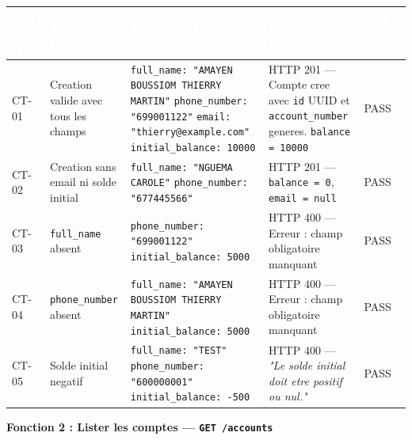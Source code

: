 \documentclass[12pt,a4paper]{article}
\begin{document}
\begin{longtable}{|L{1.6cm}|L{3.8cm}|L{5.2cm}|L{4.2cm}|L{1.8cm}|}
\hline
{}
\textbf{\textcolor{white}{Test Case ID}} & \textbf{\textcolor{white}{Test Case Description}} & \textbf{\textcolor{white}{Test Input (Test Case Value)}} & \textbf{\textcolor{white}{Expected Results}} & \textbf{\textcolor{white}{Test Case Status}} \\
\hline
CT-01 & Creation valide avec tous les champs &
\texttt{full\_name: "AMAYEN BOUSSIOM THIERRY MARTIN"} \newline \texttt{phone\_number: "699001122"} \newline \texttt{email: "thierry@example.com"} \newline \texttt{initial\_balance: 10000} &
HTTP 201 --- Compte cree avec \texttt{id} UUID et \texttt{account\_number} generes. \texttt{balance = 10000} & PASS \\
\hline
{}
CT-02 & Creation sans email ni solde initial &
\texttt{full\_name: "NGUEMA CAROLE"} \newline \texttt{phone\_number: "677445566"} &
HTTP 201 --- \texttt{balance = 0}, \texttt{email = null} & PASS \\
\hline
CT-03 & \texttt{full\_name} absent &
\texttt{phone\_number: "699001122"} \newline \texttt{initial\_balance: 5000} &
HTTP 400 --- Erreur : champ obligatoire manquant & PASS \\
\hline
{}
CT-04 & \texttt{phone\_number} absent &
\texttt{full\_name: "AMAYEN BOUSSIOM THIERRY MARTIN"} \newline \texttt{initial\_balance: 5000} &
HTTP 400 --- Erreur : champ obligatoire manquant & PASS \\
\hline
CT-05 & Solde initial negatif &
\texttt{full\_name: "TEST"} \newline \texttt{phone\_number: "600000001"} \newline \texttt{initial\_balance: -500} &
HTTP 400 --- \textit{"Le solde initial doit etre positif ou nul."} & PASS \\
\hline
\end{longtable}

\vspace{0.2cm}
{\bfseries\textcolor{danger}{Fonction 2 : Lister les comptes --- \texttt{GET /accounts}}}
\vspace{0.1cm}
\end{document}
